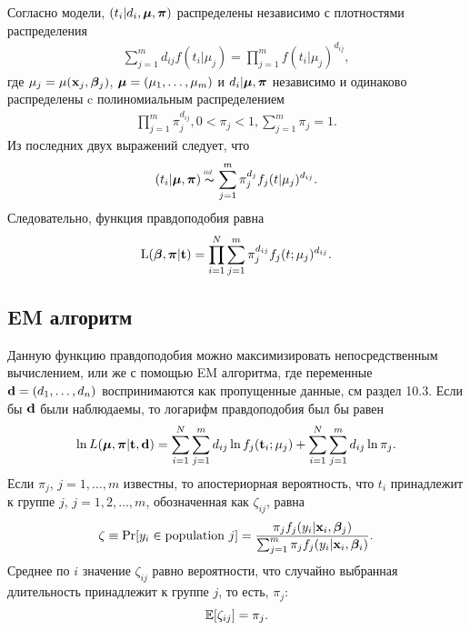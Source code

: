 Согласно модели, $(t_i|d_i,\bm{\mu}, \bm{\pi})$ распределены независимо с плотностями распределения
    \begin{align}
        \label{eq:18.19}
        \sum^{m}_{j=1} d_{ij}f(t_i|\mu_j) = \prod^{m}_{j=1}f(t_i|\mu_j)^{d_{ij}},
    \end{align}
где $\mu_j = \mu(\mathbf{x}_j, \bm{\beta}_j)$, $\bm{\mu} = (\mu_1, \ldots, \mu_m)$ и $d_i|\bm{\mu},\bm{\pi}$ независимо и одинаково распределены  c полиномиальным распределением
    \begin{align}
        \label{eq:18.20}
        \prod^{m}_{j=1}\pi_j^{d_{ij}}, 0<\pi_j<1, \sum^{m}_{j=1}\pi_j=1.
    \end{align}
Из последних двух выражений следует, что
    $$(t_i|\bm{\mu},\bm{\pi})\thicksim\!\!\!\!\!\!\!^{{}^{\textit{iid}}}\hspace{0.1cm}\sum^{m}_{j=1}\pi_j^{d_{j}}f_j(t|\mu_j)^{d_{ij}}.$$
Следовательно, функция правдоподобия равна
    \begin{align}
        \label{eq:18.21}
        \mathrm{L}(\bm{\beta},\bm{\pi}|\mathbf{t}) = \prod^{N}_{i=1}\sum^{m}_{j=1}\pi_j^{d_{ij}}f_j(t;\mu_j)^{d_{ij}}.
    \end{align}


\subsection{EM алгоритм}\label{sec:18.5.3}

\noindent
Данную функцию правдоподобия можно максимизировать непосредственным вычислением, %
или же с помощью EM алгоритма, где переменные $\mathbf{d} = (d_1, \ldots, d_n)$ воспринимаются как пропущенные %
данные, см раздел 10.3. %
Если бы $\mathbf{d}$ были наблюдаемы, то логарифм правдоподобия был бы равен
    \begin{align}
        \label{eq:18.22}
        \ln L(\bm{\mu},\bm{\pi}|\mathbf{t},\mathbf{d}) = \sum^{N}_{i=1}\sum^{m}_{j=1} d_{ij}\ln f_j (\mathbf{t}_i; \mu_j) + \sum^{N}_{i=1}\sum^{m}_{j=1} d_{ij} \ln\pi_j.
    \end{align}
Если $\pi_j$, $j = 1,\ldots,m$ известны, то апостериорная вероятность, что $t_i$ принадлежит к группе $j$, $j = 1, 2, \ldots, m$, обозначенная как $\zeta_{ij}$, равна
    \begin{align}
        \label{eq:18.23}
        \zeta \equiv \mathrm{Pr}[y_i\in\textrm{population }j] = \frac{\pi_jf_j(y_i|\mathbf{x}_i,\bm{\beta}_j)}{\sum^{m}_{j=1}\pi_jf_j(y_i|\mathbf{x}_i,\bm{\beta}_i)}.
    \end{align}
Среднее по $i$ значение $\zeta_{ij}$ равно вероятности, что случайно выбранная длительность принадлежит к группе $j$, то есть, $\pi_j$:
    $$\mathbb{E}[\zeta_{ij}] = \pi_j.$$

